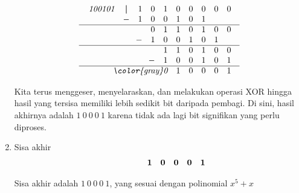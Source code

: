 \begin{enumerate}
                \[ 
                \begin{array}{r}
                        \begin{array}{cccccccccc}
                            \textit{100101}& \textbf{|} & 1 & 0 & 1 & 0 & 0 & 0 & 0 & 0 \\
                            & - & 1 & 0 & 0 & 1 & 0 & 1 &   &   \\
                            \end{array} \\
                            \hline
                            \begin{array}{ccccccccc}
                              &  & 0 & 1 & 1 & 0 & 1 & 0 & 0 \\
                               & - & 1 & 0 & 0 & 1 & 0 & 1 &  \\
                            \end{array} \\
                            \hline
                            \begin{array}{ccccccccc}
                              &  &  & 1 & 1 & 0 & 1 & 0 & 0 \\
                              &  & -& 1 & 0 & 0 & 1 & 0 & 1  \\
                            \end{array} \\
                            \hline
                            \begin{array}{ccccccccc}
                              &  &  & \textit{\color{gray}0} & 1 & 0 & 0 & 0 & 1 \\
                            \end{array} \\
                            
                    \end{array} 
                \]
        
                Kita terus menggeser, menyelaraskan, dan melakukan operasi XOR hingga hasil yang tersisa memiliki lebih sedikit bit daripada pembagi. Di sini, hasil akhirnya adalah \( 1 \ 0 \ 0 \ 0 \ 1 \) karena tidak ada lagi bit signifikan yang perlu diproses.
        
            \item Sisa akhir
                \[
                \begin{array}{ccccccccc}
                  &  &  &  & \textbf{1} & \textbf{0} & \textbf{0} & \textbf{0} & \textbf{1} \\
                \end{array} \\
                \]
        
                Sisa akhir adalah \( 1 \ 0 \ 0 \ 0 \ 1 \), yang sesuai dengan polinomial \(x^5 + x\)
        \end{enumerate}
        
